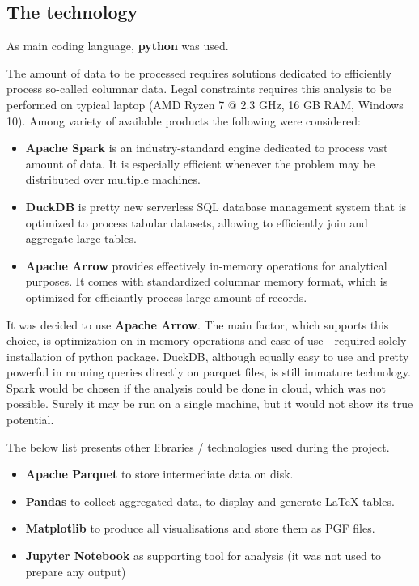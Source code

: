 \documentclass{article}
\begin{document}
\pagebreak

\subsection{The technology}

As main coding language, \textbf{python} was used.

\par The amount of data to be processed requires solutions dedicated to efficiently process so-called columnar data.
Legal constraints requires this analysis to be performed on typical laptop (AMD Ryzen 7 @ 2.3 GHz, 16 GB RAM, Windows 10).
Among variety of available products the following were considered:
\begin{itemize}
    \item \textbf{Apache Spark} is an industry-standard engine dedicated to process vast amount of data. It is especially efficient whenever the problem may be distributed over multiple machines.
    \item \textbf{DuckDB} is pretty new serverless SQL database management system that is optimized to process tabular datasets, allowing to efficiently join and aggregate large tables.
    \item \textbf{Apache Arrow} provides effectively in-memory operations for analytical purposes. It comes with standardized columnar memory format, which is optimized for efficiantly process large amount of records.
\end{itemize}

It was decided to use \textbf{Apache Arrow}.
The main factor, which supports this choice, is optimization on in-memory operations and ease of use - required solely installation of python package.
DuckDB, although equally easy to use and pretty powerful in running queries directly on parquet files, is still immature technology.
Spark would be chosen if the analysis could be done in cloud, which was not possible.
Surely it may be run on a single machine, but it would not show its true potential.

\par The below list presents other libraries / technologies used during the project.
\begin{itemize}
    \item \textbf{Apache Parquet} to store intermediate data on disk.
    \item \textbf{Pandas} to collect aggregated data, to display and generate LaTeX tables.
    \item \textbf{Matplotlib} to produce all visualisations and store them as PGF files.
    \item \textbf{Jupyter Notebook} as supporting tool for analysis (it was not used to prepare any output)
\end{itemize}
\end{document}
